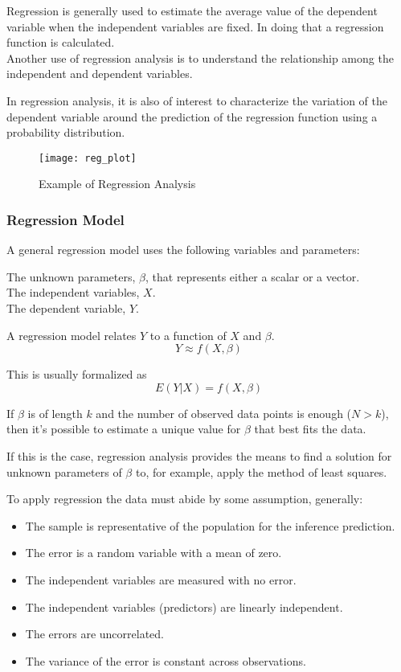 Regression is generally used to estimate the average value of the dependent variable when the independent variables are fixed. In doing that a regression function is calculated. \\
Another use of regression analysis is to understand the relationship among the independent and dependent variables.

In regression analysis, it is also of interest to characterize the variation of the dependent variable around the prediction of the regression function using a probability distribution.

\begin{figure}[H]
	\centering
	\texttt{[image: reg\_plot]}
	\caption{Example of Regression Analysis}
	\label{fig:reg_plot}
\end{figure}	

\subsubsection*{Regression Model} 
A general regression model uses the following variables and parameters:

The unknown parameters, $\beta$, that represents either a scalar or a vector.\\
The independent variables, $X$. \\
The dependent variable, $Y$.

A regression model relates $Y$ to a function of $X$ and $\beta$.
\begin{equation}
	Y \approx f(X,\beta)
\end{equation}

This is usually formalized as
\begin{equation}
	E(Y|X) = f(X,\beta)
\end{equation}

If $\beta$ is of length $k$ and the number of observed data points is enough ($N > k$), then it's possible to estimate a unique value for $\beta$ that best fits the data.

If this is the case, regression analysis provides the means to find a solution for unknown parameters of $\beta$ to, for example, apply the method of least squares.

To apply regression the data must abide by some assumption, generally:
\begin{itemize}[noitemsep, topsep = -5pt]
	\item The sample is representative of the population for the inference prediction.
	\item The error is a random variable with a mean of zero.
	\item The independent variables are measured with no error.
	\item The independent variables (predictors) are linearly independent.
	\item The errors are uncorrelated.
	\item The variance of the error is constant across observations.
\end{itemize}

